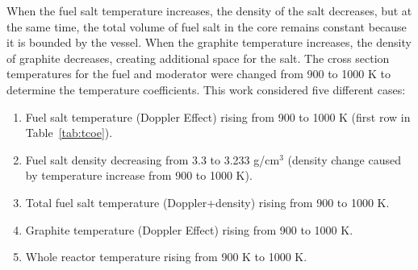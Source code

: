 When the fuel salt temperature increases, the density of the salt decreases, 
but at the same time, the total volume of fuel salt in the 
core remains constant because it
is bounded by the vessel. When the graphite 
temperature increases, the density of
graphite decreases, creating additional 
space for the salt. The cross section temperatures for the fuel and moderator 
were changed from 900 to 1000 K to determine the temperature coefficients. 
This work considered five different cases:
\begin{enumerate}
	\item Fuel salt temperature (Doppler Effect) rising from 900 to 1000 K 
	(first row  in Table~\ref{tab:tcoe}).
	\item Fuel salt density decreasing from 3.3 to 3.233 g/cm$^3$ 
	(density change caused by temperature increase from	900 to 1000 K).
	\item Total fuel salt temperature (Doppler+density) rising from 900 to 
	1000 K.	
	\item Graphite temperature (Doppler Effect) rising from 900 to 1000 K.
	\item Whole reactor temperature rising from 900 K to 1000 K.
\end{enumerate}

